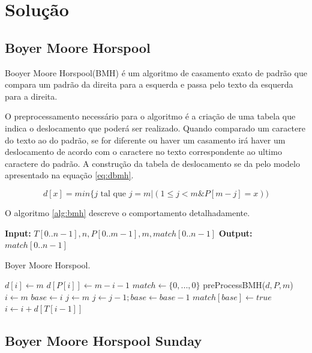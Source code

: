 \documentclass[11pt]{article}
\begin{document}
\section{Solução}
\label{sec:orgc4be543}

\subsection{Boyer Moore Horspool}
\label{sec:org627a789}

Booyer Moore Horspool(BMH) é um algoritmo de casamento exato de padrão que compara um padrão da direita para a esquerda e passa pelo texto da esquerda para a direita. 

O preprocessamento necessário para o algoritmo é a criação de uma tabela que indica o deslocamento que poderá ser realizado. Quando comparado um caractere do texto ao do padrão, se for diferente ou haver um casamento irá haver um deslocamento de acordo com o caractere no texto correspondente ao ultimo caractere do padrão. A construção da tabela de deslocamento se da pelo modelo apresentado na equação \ref{eq:dbmh}.

\begin{equation}
d[x]=min\{ j \text{ tal que } j =m | (1 \leq j < m \& P[m-j]=x))
\label{eq:dbmh}
\end{equation}

O algoritmo \ref{alg:bmh} descreve o comportamento detalhadamente.

\begin{algorithm}
\textbf{Input:} $T[0..n-1], n, P[0..m-1], m, match[0..n-1]$
\textbf{Output:} $match[0..n-1]$
\caption{Boyer Moore Horspool.}\label{alg:bmh}
\begin{algorithmic}[1]
\State $d[i]\gets m$
\EndFor
{}
\State $d[P[i]]\gets m-i-1$
\EndFor
\EndProcedure
{}
\State $match\gets \{0,...,0\}$
\State preProcessBMH($d,P,m$)
\State $i\gets m$
\State $base\gets i$
\State $j\gets m$
\State $j\gets j-1; base\gets base -1$
\EndWhile
{}
\State $match[base]\gets true$
\EndIf
\State $i\gets i+d[T[i-1]]$
\EndWhile
\EndProcedure
\end{algorithmic}
\end{algorithm}

\subsection{Boyer Moore Horspool Sunday}
\label{sec:org51d6441}
\end{document}
